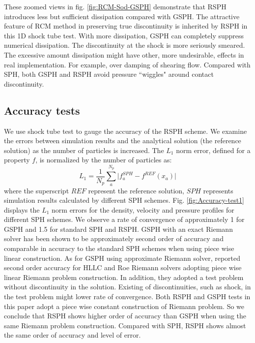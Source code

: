 \documentclass[review]{elsarticle}
\begin{document}
These zoomed views in fig. \ref{fig:RCM-Sod-GSPH} demonstrate that RSPH introduces less but sufficient dissipation compared with GSPH. The attractive feature of RCM method in preserving true discontinuity is inherited by RSPH in this 1D shock tube test. With more dissipation, GSPH can completely suppress numerical dissipation. The discontinuity at the shock is more seriously smeared. The excessive amount dissipation might have other, more undesirable, effects in real implementation. For example, over damping of shearing flow. Compared with SPH, both GSPH and RSPH avoid pressure ``wiggles" around contact discontinuity. 

\subsection{Accuracy tests}
We use shock tube test to gauge the accuracy of the RSPH scheme.
We examine the errors between simulation results and the analytical solution (the reference solution) as the number of particles is increased. The $L_1$ norm error, defined for a property $f$, is normalized by the number of particles as:
\begin{equation}
L_1= \frac{1}{N_p} \sum_a^{N_p} \vert f_a^{SPH} - f^{REF} (x_a) \vert 
\end{equation}
where the superscript $REF$ represent the reference solution, $SPH$ represents simulation results calculated by different SPH schemes. Fig. \ref{fig:Accuracy-test1} displays the $L_1$ norm errors for the density, velocity and pressure profiles for different SPH schemes.
We observe a rate of convergence of approximately 1 for GSPH and 1.5 for standard SPH and RSPH.
GSPH with an exact Riemann solver has been shown to be approximately second order of accuracy \citep{puri2014comparison} and comparable in accuracy to the standard SPH schemes when using piece wise linear construction. As for GSPH using approximate Riemann solver, \citet{puri2014approximate} reported second order accuracy for HLLC and Roe Riemann solvers adopting piece wise linear Riemann problem construction. In addition, they adopted a test problem without discontinuity in the solution. Existing of discontinuities, such as shock, in the test problem might lower rate of convergence. Both RSPH and GSPH tests in this paper adopt a piece wise constant construction of Riemann problem. So we conclude that RSPH shows higher order of accuracy than GSPH when using the same Riemann problem construction. Compared with SPH, RSPH shows almost the same order of accuracy and level of error.
\end{document}
